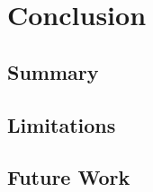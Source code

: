 
\chapter{Conclusion}\label{chapter-10}

\section{Summary}

\section{Limitations}

\section{Future Work}

